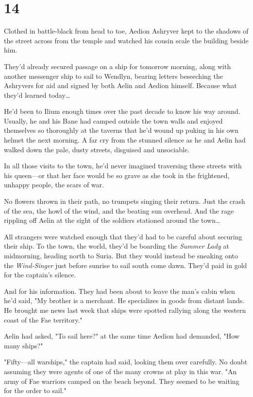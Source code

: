 
\chapter{14}

Clothed in battle-black from head to toe, Aedion Ashryver kept to the shadows of the street across from the temple and watched his cousin scale the building beside him.

They'd already secured passage on a ship for tomorrow morning, along with another messenger ship to sail to Wendlyn, bearing letters beseeching the Ashryvers for aid and signed by both Aelin and Aedion himself.
Because what they'd learned today\ldots{}

He'd been to Ilium enough times over the past decade to know his way around.
Usually, he and his Bane had camped outside the town walls and enjoyed themselves so thoroughly at the taverns that he'd wound up puking in his own helmet the next morning.
A far cry from the stunned silence as he and Aelin had walked down the pale, dusty streets, disguised and unsociable.

In all those visits to the town, he'd never imagined traversing these streets with his queen---or that her face would be so grave as she took in the frightened, unhappy people, the scars of war.

No flowers thrown in their path, no trumpets singing their return.
Just the crash of the sea, the howl of the wind, and the beating sun overhead.
And the rage rippling off Aelin at the sight of the soldiers stationed around the town\ldots{}

All strangers were watched enough that they'd had to be careful about securing their ship.
To the town, the world, they'd be boarding the \emph{Summer Lady} at midmorning, heading north to Suria.
But they would instead be sneaking onto the \emph{Wind-Singer} just before sunrise to sail south come dawn.
They'd paid in gold for the captain's silence.

And for his information.
They had been about to leave the man's cabin when he'd said, "My brother is a merchant.
He specializes in goods from distant lands.
He brought me news last week that ships were spotted rallying along the western coast of the Fae territory."

Aelin had asked, "To sail here?"
at the same time Aedion had demanded, "How many ships?"

"Fifty---all warships," the captain had said, looking them over carefully.
No doubt assuming they were agents of one of the many crowns at play in this war.
"An army of Fae warriors camped on the beach beyond.
They seemed to be waiting for the order to sail."

